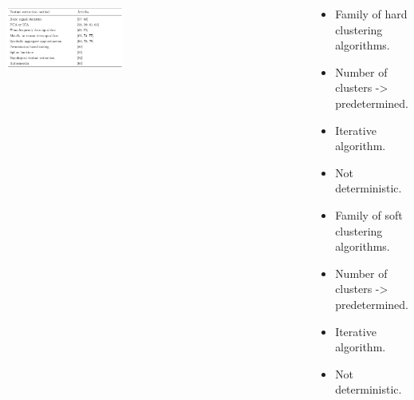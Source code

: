 \documentclass[18pt, a3paper, portrait]{tikzposter}
\begin{document}
\begin{columns}
    {
        \begin{tikzfigure}
            \includegraphics[width=0.4\textwidth]{images/feature_based_rep_meth_table.png}
        \end{tikzfigure}
    }
    \begin{subcolumns}
    {
        \begin{itemize}
            \item Family of hard clustering algorithms.
            \item Number of clusters -> predetermined.
            \item Iterative algorithm. 
            \item Not deterministic.
        \end{itemize}
    }

    {
        \begin{itemize}
            \item Family of soft clustering algorithms.
            \item Number of clusters -> predetermined.
            \item Iterative algorithm. 
            \item Not deterministic.
        \end{itemize}
    }
    \end{subcolumns}
 

\end{columns}
\end{document}
